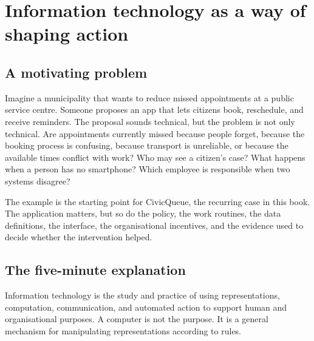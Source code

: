 \chapter{Information technology as a way of shaping action}
\label{ch:it}

\section{A motivating problem}
Imagine a municipality that wants to reduce missed appointments at a public service centre. Someone proposes an app that lets citizens book, reschedule, and receive reminders. The proposal sounds technical, but the problem is not only technical. Are appointments currently missed because people forget, because the booking process is confusing, because transport is unreliable, or because the available times conflict with work? Who may see a citizen's case? What happens when a person has no smartphone? Which employee is responsible when two systems disagree?

The example is the starting point for CivicQueue, the recurring case in this book. The application matters, but so do the policy, the work routines, the data definitions, the interface, the organisational incentives, and the evidence used to decide whether the intervention helped.


\section{The five-minute explanation}
Information technology is the study and practice of using representations, computation, communication, and automated action to support human and organisational purposes. A computer is not the purpose. It is a general mechanism for manipulating representations according to rules.


